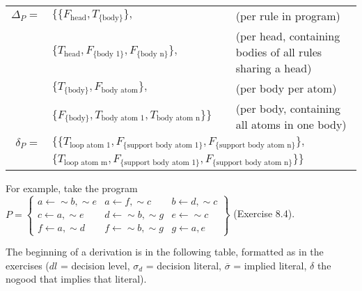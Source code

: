 \documentclass[9pt,a4paper,landscape]{article}
\newcommand{\ngtb}[1]{T_{ \{#1\} }}
\newcommand{\ngfb}[1]{F_{ \{#1\} }}
\newcommand{\ngta}[1]{T_{#1}}
\newcommand{\ngfa}[1]{F_{#1}}
\begin{document}
{\begin{center}
	\begin{tabular}{rll}
		$\Delta_P =$ 	& $\{ \{ \ngfa{\text{head}}, \ngtb{\text{body}} \},$ & (per rule in program) \\
		& $\{ \ngta{\text{head}}, \ngfb{\text{body 1}}, \ngfb{\text{body n}} \},$ & (per head, containing bodies of all rules sharing a head) \\
		& $\{ \ngtb{\text{body}}, \ngfa{\text{body atom}} \},$ & (per body per atom)\\
		& $\{ \ngfb{\text{body}}, \ngta{\text{body atom 1}}, \ngta{\text{body atom n}} \} \}$ & (per body, containing all atoms in one body)\\[1em]
		$\delta_P =$ 	& $\{ \{ \ngta{\text{loop atom 1}}, \ngfb{\text{support body atom 1}}, \ngfb{\text{support body atom n}} \},$ \\
		& $\{ \ngta{\text{loop atom m}}, \ngfb{\text{support body atom 1}}, \ngfb{\text{support body atom n}} \} \}$ \\
	\end{tabular}
\end{center}


For example, take the program $P = \left\{\begin{array}{lll}
a \leftarrow {\sim} b, {\sim} e &a \leftarrow f, {\sim} c & b \leftarrow d, {\sim} c \\
c \leftarrow a, {\sim} e & d \leftarrow {\sim} b, {\sim} g & e \leftarrow {\sim} c\\
f \leftarrow a, {\sim} d & f \leftarrow {\sim} b, {\sim} g & g \leftarrow a, e
\end{array}\right\}$ (Exercise 8.4).
\vspace{\baselineskip}

The beginning of a derivation is in the following table, formatted as in the exercises ($dl$ = decision level, $\sigma_d$ = decision literal, $\overline{\sigma}$ = implied literal, $\delta$ the nogood that implies that literal).

}
\end{document}
